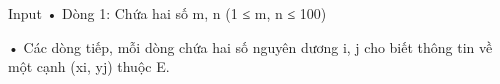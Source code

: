 Input
• Dòng 1: Chứa hai số m, n (1 ≤ m, n ≤ 100)   


   • Các dòng tiếp, mỗi dòng chứa hai số nguyên dương i, j cho biết thông tin về một cạnh (xi, yj) thuộc E.